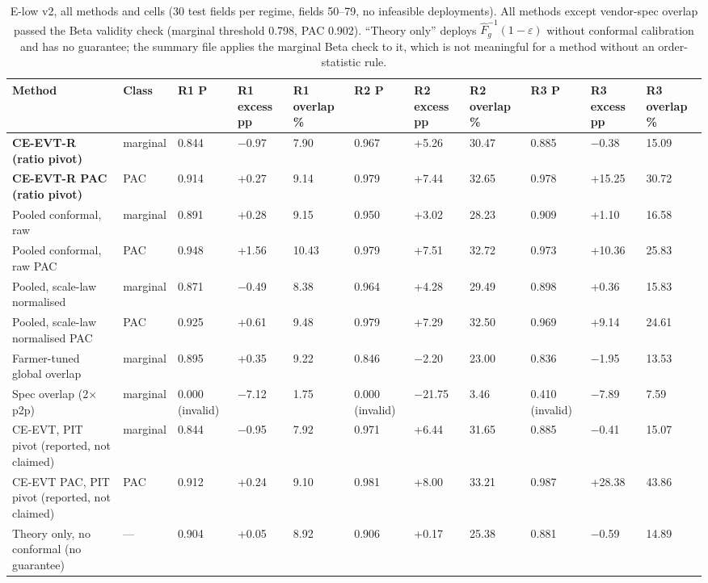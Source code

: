 \documentclass[preprint,12pt,authoryear]{elsarticle}
\begin{document}
\begin{table}[!htbp]
\centering
\scriptsize
\renewcommand{\thetable}{S8}\caption{E-low v2, all methods and cells (30 test fields per regime, fields 50--79, no infeasible deployments). All methods except vendor-spec overlap passed the Beta validity check (marginal threshold 0.798, PAC 0.902). ``Theory only'' deploys \(\hat F_g^{-1}(1-\varepsilon)\) without conformal calibration and has no guarantee; the summary file applies the marginal Beta check to it, which is not meaningful for a method without an order-statistic rule.}
\begin{adjustbox}{max width=\textwidth}
\begin{tabular}{@{}>{\raggedright\arraybackslash}p{20.0em}llllllllll@{}}
\toprule
\textbf{Method} & \textbf{Class} & \textbf{R1 P} & \textbf{R1 excess pp} & \textbf{R1 overlap \%} & \textbf{R2 P} & \textbf{R2 excess pp} & \textbf{R2 overlap \%} & \textbf{R3 P} & \textbf{R3 excess pp} & \textbf{R3 overlap \%} \\
\midrule
\textbf{CE-EVT-R (ratio pivot)} & marginal & 0.844 & −0.97 & 7.90 & 0.967 & +5.26 & 30.47 & 0.885 & −0.38 & 15.09 \\
\textbf{CE-EVT-R PAC (ratio pivot)} & PAC & 0.914 & +0.27 & 9.14 & 0.979 & +7.44 & 32.65 & 0.978 & +15.25 & 30.72 \\
Pooled conformal, raw & marginal & 0.891 & +0.28 & 9.15 & 0.950 & +3.02 & 28.23 & 0.909 & +1.10 & 16.58 \\
Pooled conformal, raw PAC & PAC & 0.948 & +1.56 & 10.43 & 0.979 & +7.51 & 32.72 & 0.973 & +10.36 & 25.83 \\
Pooled, scale-law normalised & marginal & 0.871 & −0.49 & 8.38 & 0.964 & +4.28 & 29.49 & 0.898 & +0.36 & 15.83 \\
Pooled, scale-law normalised PAC & PAC & 0.925 & +0.61 & 9.48 & 0.979 & +7.29 & 32.50 & 0.969 & +9.14 & 24.61 \\
Farmer-tuned global overlap & marginal & 0.895 & +0.35 & 9.22 & 0.846 & −2.20 & 23.00 & 0.836 & −1.95 & 13.53 \\
Spec overlap (2× p2p) & marginal & 0.000 (invalid) & −7.12 & 1.75 & 0.000 (invalid) & −21.75 & 3.46 & 0.410 (invalid) & −7.89 & 7.59 \\
CE-EVT, PIT pivot (reported, not claimed) & marginal & 0.844 & −0.95 & 7.92 & 0.971 & +6.44 & 31.65 & 0.885 & −0.41 & 15.07 \\
CE-EVT PAC, PIT pivot (reported, not claimed) & PAC & 0.912 & +0.24 & 9.10 & 0.981 & +8.00 & 33.21 & 0.987 & +28.38 & 43.86 \\
Theory only, no conformal (no guarantee) & --- & 0.904 & +0.05 & 8.92 & 0.906 & +0.17 & 25.38 & 0.881 & −0.59 & 14.89 \\
\bottomrule
\end{tabular}
\end{adjustbox}
\end{table}
\end{document}
